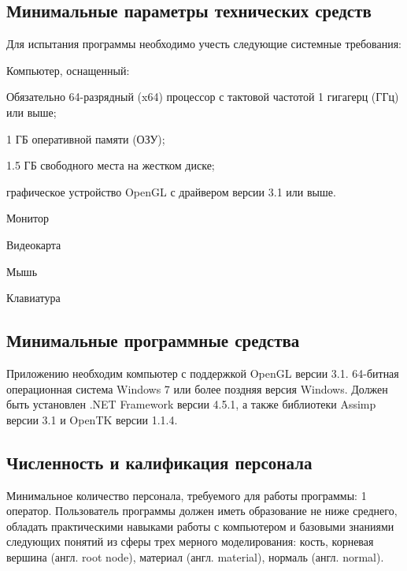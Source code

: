 \subsection{Минимальные параметры технических средств}
Для испытания программы необходимо учесть следующие системные требования:
\begin{my_enumerate}
\item Компьютер, оснащенный:
    \begin{my_enumerate}
    \item Обязательно 64-разрядный (x64) процессор с тактовой частотой 1 гигагерц (ГГц) или выше;
    \item 1 ГБ оперативной памяти (ОЗУ);
    \item 1.5 ГБ свободного места на жестком диске;
    \item графическое устройство OpenGL с драйвером версии 3.1 или выше.
    \end{my_enumerate}
\item Монитор
\item Видеокарта
\item Мышь
\item Клавиатура
\end{my_enumerate}


\subsection{Минимальные программные средства}
Приложению необходим компьютер с поддержкой OpenGL версии 3.1. 64-битная операционная система Windows 7 или более поздняя версия Windows. Должен быть установлен .NET Framework версии 4.5.1, а также библиотеки Assimp версии 3.1 и OpenTK версии 1.1.4.

\subsection{Численность и калификация персонала}
Минимальное количество персонала, требуемого для работы программы: 1 оператор. Пользователь программы должен иметь образование не ниже среднего, обладать практическими навыками работы с компьютером и базовыми знаниями следующих понятий из сферы трех мерного моделирования: кость, корневая вершина (англ. root node), материал (англ. material), нормаль (англ. normal).
